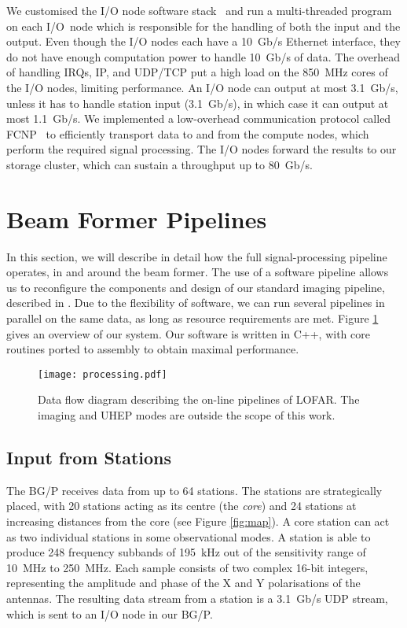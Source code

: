 \documentclass{llncs}
\begin{document}
We customised the I/O node software stack~\cite{Yoshii:10} and run a multi-threaded program on each I/O~node which is responsible for the handling of both the input and the output. Even though the I/O nodes each have a 10~Gb/s Ethernet interface, they do not have enough computation power to handle 10~Gb/s of data. The overhead of handling IRQs, IP, and UDP/TCP put a high load on the 850~MHz cores of the I/O nodes, limiting performance. An I/O node can output at most 3.1~Gb/s, unless it has to handle station input (3.1~Gb/s), in which case it can output at most 1.1~Gb/s. We implemented a low-overhead communication protocol called FCNP~\cite{Romein:09a} to efficiently transport data to and from the compute nodes, which perform the required signal processing. The I/O nodes forward the results to our storage cluster, which can sustain a throughput up to 80~Gb/s.

\section{Beam Former Pipelines}
\label{Sec:pipelines}

In this section, we will describe in detail how the full signal-processing pipeline operates, in and around the beam former. The use of a software pipeline allows us to reconfigure the components and design of our standard imaging pipeline, described in \cite{Romein:10a}. Due to the flexibility of software, we can run several pipelines in parallel on the same data, as long as resource requirements are met. Figure \ref{fig:processing} gives an overview of our system. Our software is written in C++, with core routines ported to assembly to obtain maximal performance.

\begin{figure}[ht]
\center
\texttt{[image: processing.pdf]}
\caption{Data flow diagram describing the on-line pipelines of LOFAR. The imaging and UHEP modes are outside the scope of this work.}
\label{fig:processing}
\end{figure}

\subsection{Input from Stations}
The BG/P receives data from up to 64 stations. The stations are strategically placed, with 20 stations acting as its centre (the \emph{core}) and 24 stations at increasing distances from the core (see Figure \ref{fig:map}). A core station can act as two individual stations in some observational modes. A station is able to produce 248 frequency subbands of 195~kHz out of the sensitivity range of 10~MHz to 250~MHz. Each sample consists of two complex 16-bit integers, representing the amplitude and phase of the X and Y polarisations of the antennas. The resulting data stream from a station is a 3.1~Gb/s UDP stream, which is sent to an I/O node in our BG/P.
\end{document}
